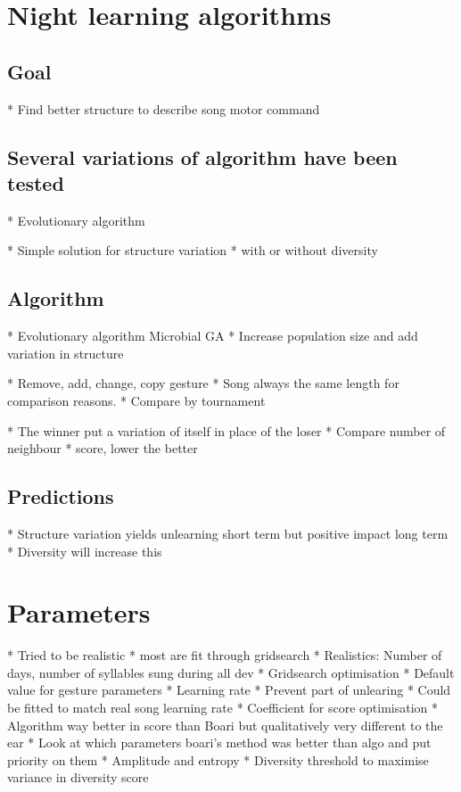 \documentclass{report}
\begin{document}
\section{Night learning algorithms}\label{night-learning-algorithms}

\subsection{Goal}\label{goal-1}

  * Find better structure to describe song motor command
\subsection{Several variations of algorithm have been
tested}\label{several-variations-of-algorithm-have-been-tested}

  * Evolutionary algorithm

        * Simple solution for structure variation
    * with or without diversity
\subsection{Algorithm}\label{algorithm}

  * Evolutionary algorithm Microbial GA
  * Increase population size and add variation in structure

        * Remove, add, change, copy gesture
      * Song always the same length for comparison reasons.
    * Compare by tournament

        * The winner put a variation of itself in place of the loser
      * Compare number of neighbour * score, lower the better
\subsection{Predictions}\label{predictions}

  * Structure variation yields unlearning short term but positive impact
  long term
  * Diversity will increase this

\section{Parameters}\label{parameters}

  * Tried to be realistic
  * most are fit through gridsearch
  * Realistics: Number of days, number of syllables sung during all dev
  * Gridsearch optimisation
  * Default value for gesture parameters
  * Learning rate
        * Prevent part of unlearing
      * Could be fitted to match real song learning rate
      * Coefficient for score optimisation
    * Algorithm way better in score than Boari but qualitatively very
  different to the ear
  * Look at which parameters boari's method was better than algo and put
  priority on them
  * Amplitude and entropy
  * Diversity threshold to maximise variance in diversity score
\end{document}
